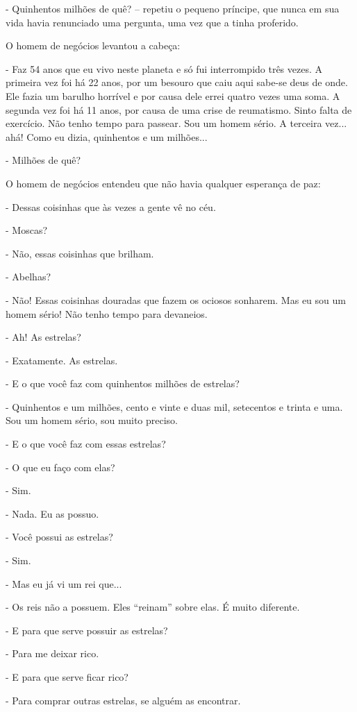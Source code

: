 - Quinhentos milhões de quê? -- repetiu o pequeno príncipe, que nunca em
sua vida havia renunciado uma pergunta, uma vez que a tinha proferido.

O homem de negócios levantou a cabeça:

- Faz 54 anos que eu vivo neste planeta e só fui interrompido três
vezes. A primeira vez foi há 22 anos, por um besouro que caiu aqui
sabe-se deus de onde. Ele fazia um barulho horrível e por causa dele
errei quatro vezes uma soma. A segunda vez foi há 11 anos, por causa de
uma crise de reumatismo. Sinto falta de exercício. Não tenho tempo para
passear. Sou um homem sério. A terceira vez... ahá! Como eu dizia,
quinhentos e um milhões...

- Milhões de quê?

O homem de negócios entendeu que não havia qualquer esperança de paz:

- Dessas coisinhas que às vezes a gente vê no céu.

- Moscas?

- Não, essas coisinhas que brilham.

- Abelhas?

- Não! Essas coisinhas douradas que fazem os ociosos sonharem. Mas eu
sou um homem sério! Não tenho tempo para devaneios.

- Ah! As estrelas?

- Exatamente. As estrelas.

- E o que você faz com quinhentos milhões de estrelas?

- Quinhentos e um milhões, cento e vinte e duas mil, setecentos e trinta
e uma. Sou um homem sério, sou muito preciso.

- E o que você faz com essas estrelas?

- O que eu faço com elas?

- Sim.

- Nada. Eu as possuo.

- Você possui as estrelas?

- Sim.

- Mas eu já vi um rei que...

- Os reis não a possuem. Eles ``reinam'' sobre elas. É muito diferente.

- E para que serve possuir as estrelas?

- Para me deixar rico.

- E para que serve ficar rico?

- Para comprar outras estrelas, se alguém as encontrar.

